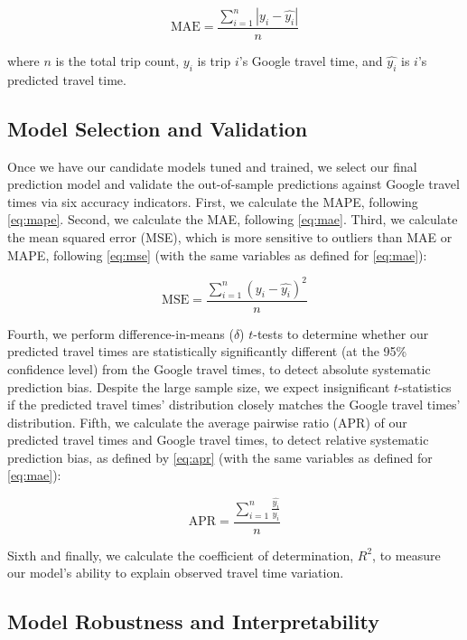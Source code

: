 \documentclass[12pt,letterpaper]{article} %
\begin{document}
\begin{equation}
\label{eq:mae}
\text{MAE} = \frac{\sum^{n}_{i=1} \left|{y_i - \hat{y_i}}\right|}{n}
\end{equation}

where $n$ is the total trip count, $y_i$ is trip $i$'s Google travel time, and $\hat{y_i}$ is $i$'s predicted travel time.

\subsection{Model Selection and Validation}

Once we have our candidate models tuned and trained, we select our final prediction model and validate the out-of-sample predictions against Google travel times via six accuracy indicators. First, we calculate the MAPE, following \autoref{eq:mape}. Second, we calculate the MAE, following \autoref{eq:mae}. Third, we calculate the mean squared error (MSE), which is more sensitive to outliers than MAE or MAPE, following \autoref{eq:mse} (with the same variables as defined for \autoref{eq:mae}):

\begin{equation}
\label{eq:mse}
\text{MSE} = \frac{\sum^{n}_{i=1} (y_i - \hat{y_i})^2}{n}
\end{equation}

Fourth, we perform difference-in-means ($\delta$) $t$-tests to determine whether our predicted travel times are statistically significantly different (at the 95\% confidence level) from the Google travel times, to detect absolute systematic prediction bias. Despite the large sample size, we expect insignificant $t$-statistics if the predicted travel times' distribution closely matches the Google travel times' distribution. Fifth, we calculate the average pairwise ratio (APR) of our predicted travel times and Google travel times, to detect relative systematic prediction bias, as defined by \autoref{eq:apr} (with the same variables as defined for \autoref{eq:mae}):

\begin{equation}
\label{eq:apr}
\text{APR} = \frac{\sum^{n}_{i=1}\frac{\hat{y_i}}{y_i}}{n}
\end{equation}

Sixth and finally, we calculate the coefficient of determination, $R^2$, to measure our model's ability to explain observed travel time variation.

\subsection{Model Robustness and Interpretability}
\end{document}
